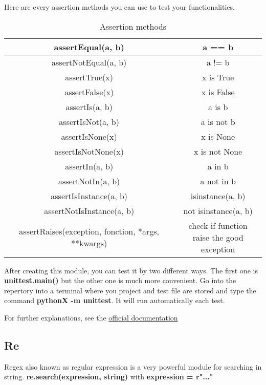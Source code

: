 \documentclass[a4paper, 12pt, titlepage]{scrartcl} %
\begin{document}
Here are every assertion methods you can use to test your functionalities.
\begin{table}[h]
\begin{center}
{\renewcommand{\arraystretch}{1}
{\setlength{\tabcolsep}{0.5cm} 
\begin{tabular}{|c|c|}
  \hline
  assertEqual(a, b) & a == b \\
  \hline
  assertNotEqual(a, b) & a != b \\
  \hline
  assertTrue(x) & x is True \\
  \hline
  assertFalse(x) & x is False \\
  \hline
  assertIs(a, b) & a is b \\
  \hline
  assertIsNot(a, b) & a is not b \\
  \hline
  assertIsNone(x) & x is None \\
  \hline
  assertIsNotNone(x) & x is not None \\
  \hline
  assertIn(a, b) & a in b \\
  \hline
  assertNotIn(a, b) & a not in b \\
  \hline
  assertIsInstance(a, b) & isinstance(a, b) \\
  \hline
  assertNotIsInstance(a, b) & not isinstance(a, b) \\
  \hline
  assertRaises(exception, fonction, *args, **kwargs) & \makecell{check if function \\ raise the good exception}  \\
  \hline
\end{tabular}}}
\end{center}
\caption{Assertion methods}
\end{table} \vspace{5mm}

After creating this module, you can test it by two different ways. The first one is \textbf{unittest.main()} but the other one is much more convenient. Go into the repertory into a terminal where you project and test file are stored and type the command \textbf{pythonX -m unittest}. It will run automatically each test.

\vspace{5mm}

For further explanations, see the \href{https://docs.python.org/3/library/unittest.html}{official documentation}


\subsection{Re}
Regex also known as regular expression is a very powerful module for searching in string. \textbf{re.search(expression, string)} with \textbf{expression = r"..."}
\end{document}
